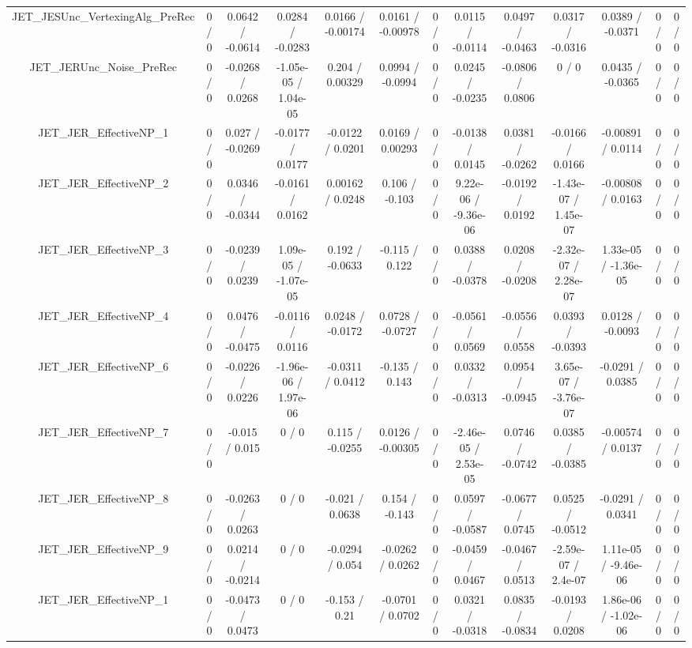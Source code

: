 \documentclass[10pt]{article}
\begin{document}
\begin{table}[htbp]
\begin{center}
\begin{tabular}{|c|c|c|c|c|c|c|c|c|c|c|c|c|}
  JET_JESUnc_VertexingAlg_PreRec & 0 / 0 & 0.0642 / -0.0614 & 0.0284 / -0.0283 & 0.0166 / -0.00174 & 0.0161 / -0.00978 & 0 / 0 & 0.0115 / -0.0114 & 0.0497 / -0.0463 & 0.0317 / -0.0316 & 0.0389 / -0.0371 & 0 / 0 & 0 / 0 \\ 
  JET_JERUnc_Noise_PreRec & 0 / 0 & -0.0268 / 0.0268 & -1.05e-05 / 1.04e-05 & 0.204 / 0.00329 & 0.0994 / -0.0994 & 0 / 0 & 0.0245 / -0.0235 & -0.0806 / 0.0806 & 0 / 0 & 0.0435 / -0.0365 & 0 / 0 & 0 / 0 \\ 
  JET_JER_EffectiveNP_1 & 0 / 0 & 0.027 / -0.0269 & -0.0177 / 0.0177 & -0.0122 / 0.0201 & 0.0169 / 0.00293 & 0 / 0 & -0.0138 / 0.0145 & 0.0381 / -0.0262 & -0.0166 / 0.0166 & -0.00891 / 0.0114 & 0 / 0 & 0 / 0 \\ 
  JET_JER_EffectiveNP_2 & 0 / 0 & 0.0346 / -0.0344 & -0.0161 / 0.0162 & 0.00162 / 0.0248 & 0.106 / -0.103 & 0 / 0 & 9.22e-06 / -9.36e-06 & -0.0192 / 0.0192 & -1.43e-07 / 1.45e-07 & -0.00808 / 0.0163 & 0 / 0 & 0 / 0 \\ 
  JET_JER_EffectiveNP_3 & 0 / 0 & -0.0239 / 0.0239 & 1.09e-05 / -1.07e-05 & 0.192 / -0.0633 & -0.115 / 0.122 & 0 / 0 & 0.0388 / -0.0378 & 0.0208 / -0.0208 & -2.32e-07 / 2.28e-07 & 1.33e-05 / -1.36e-05 & 0 / 0 & 0 / 0 \\ 
  JET_JER_EffectiveNP_4 & 0 / 0 & 0.0476 / -0.0475 & -0.0116 / 0.0116 & 0.0248 / -0.0172 & 0.0728 / -0.0727 & 0 / 0 & -0.0561 / 0.0569 & -0.0556 / 0.0558 & 0.0393 / -0.0393 & 0.0128 / -0.0093 & 0 / 0 & 0 / 0 \\ 
  JET_JER_EffectiveNP_6 & 0 / 0 & -0.0226 / 0.0226 & -1.96e-06 / 1.97e-06 & -0.0311 / 0.0412 & -0.135 / 0.143 & 0 / 0 & 0.0332 / -0.0313 & 0.0954 / -0.0945 & 3.65e-07 / -3.76e-07 & -0.0291 / 0.0385 & 0 / 0 & 0 / 0 \\ 
  JET_JER_EffectiveNP_7 & 0 / 0 & -0.015 / 0.015 & 0 / 0 & 0.115 / -0.0255 & 0.0126 / -0.00305 & 0 / 0 & -2.46e-05 / 2.53e-05 & 0.0746 / -0.0742 & 0.0385 / -0.0385 & -0.00574 / 0.0137 & 0 / 0 & 0 / 0 \\ 
  JET_JER_EffectiveNP_8 & 0 / 0 & -0.0263 / 0.0263 & 0 / 0 & -0.021 / 0.0638 & 0.154 / -0.143 & 0 / 0 & 0.0597 / -0.0587 & -0.0677 / 0.0745 & 0.0525 / -0.0512 & -0.0291 / 0.0341 & 0 / 0 & 0 / 0 \\ 
  JET_JER_EffectiveNP_9 & 0 / 0 & 0.0214 / -0.0214 & 0 / 0 & -0.0294 / 0.054 & -0.0262 / 0.0262 & 0 / 0 & -0.0459 / 0.0467 & -0.0467 / 0.0513 & -2.59e-07 / 2.4e-07 & 1.11e-05 / -9.46e-06 & 0 / 0 & 0 / 0 \\ 
  JET_JER_EffectiveNP_1 & 0 / 0 & -0.0473 / 0.0473 & 0 / 0 & -0.153 / 0.21 & -0.0701 / 0.0702 & 0 / 0 & 0.0321 / -0.0318 & 0.0835 / -0.0834 & -0.0193 / 0.0208 & 1.86e-06 / -1.02e-06 & 0 / 0 & 0 / 0 \\ 

\end{tabular}
\end{center}
\end{table}
\end{document}
